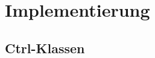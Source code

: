 \chapter{Implementierung}
\label{cha:implementierung}


\section{Ctrl-Klassen}
\label{sec:ctrlklassen}


